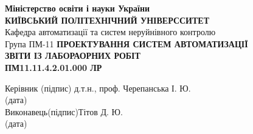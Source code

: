 \documentclass[a4paper]{article}
\begin{document}
\thispagestyle{empty}
\centering
\textbf{Міністерство освіти і науки України}\\
\textbf{КИЇВСЬКИЙ ПОЛІТЕХНІЧНИЙ УНІВЕРССИТЕТ}\\[2cm]
\raggedleft
Кафедра автоматизації та систем неруйнівного контролю\\
Група ПМ-11
\vfill
\centering
\textbf{ПРОЕКТУВАННЯ СИСТЕМ АВТОМАТИЗАЦІЇ}\\[1cm]
\textbf{ЗВІТИ ІЗ ЛАБОРАОРНИХ РОБІТ}\\[1cm]
\textbf{ПМ11.11.4.2.01.000 ЛР}
\vfill
\begin{flushleft}
    Керівник  \qquad\qquad\quad \hfill\qquad (підпис)\hfill 
    д.т.н., проф. Черепанська І. Ю.\\
    \hfill (дата)\\[2cm]
    Виконавець\hfill (підпис)\hfill Тітов Д. Ю.\\
    \hfill (дата)
\end{flushleft}
\vfill
{}
\newpage


\end{document}
